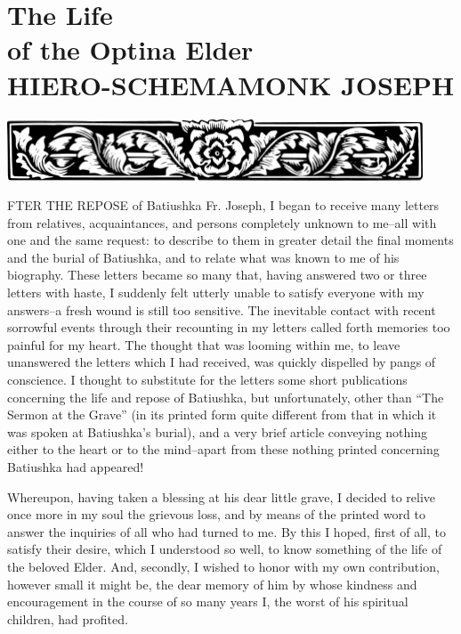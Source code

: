 \part{The Life\\of the Optina Elder\\HIERO-SCHEMAMONK JOSEPH}

\newpage
\begin{center}
	\includegraphics[width=\the\textwidth]{./Images/Chapter_Banner.png}\\
	\vspace{1.5cm}
\end{center}
FTER THE REPOSE of Batiushka Fr. Joseph, I began to receive many letters from relatives, acquaintances, and persons completely unknown to me--all with one and the same request: to describe to them in greater detail the final moments and the burial of Batiushka, and to relate what was known to me of his biography. These letters became so many that, having answered two or three letters with haste, I suddenly felt utterly unable to satisfy everyone with my answers--a fresh wound is still too sensitive. The inevitable contact with recent sorrowful events through their recounting in my letters called forth memories too painful for my heart. The thought that was looming within me, to leave unanswered the letters which I had received, was quickly dispelled by pangs of conscience. I thought to substitute for the letters some short publications concerning the life and repose of Batiushka, but unfortunately, other than ``The Sermon at the Grave'' (in its printed form quite different from that in which it was spoken at Batiushka's burial), and a very brief article conveying nothing either to the heart or to the mind--apart from these nothing printed concerning Batiushka had appeared!

Whereupon, having taken a blessing at his dear little grave, I decided to relive once more in my soul the grievous loss, and by means of the printed word to answer the inquiries of all who had turned to me. By this I hoped, first of all, to satisfy their desire, which I understood so well, to know something of the life of the beloved Elder. And, secondly, I wished to honor with my own contribution, however small it might be, the dear memory of him by whose kindness and encouragement in the course of so many years I, the worst of his spiritual children, had profited.

